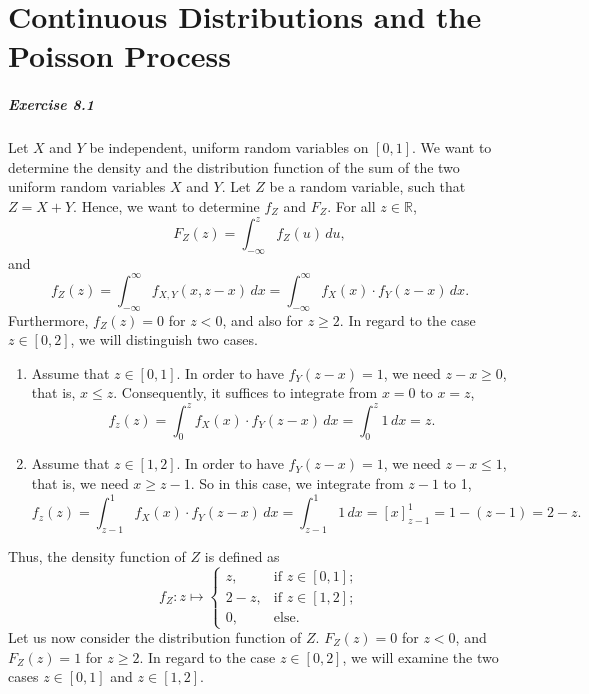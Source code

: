 \chapter{Continuous Distributions and the Poisson Process}

\paragraph{Exercise 8.1} Let $X$ and $Y$ be independent, uniform random variables
on $[0,1]$. We want to determine the density and the distribution function of the
sum of the two uniform random variables $X$ and $Y$. Let $Z$ be a random variable,
such that $Z = X + Y$. Hence, we want to determine $f_Z$ and $F_Z$. For all
$z \in \mathbb{R}$,
\[
    F_Z(z) = \int_{- \infty}^{z} f_Z(u) \, du,
\]
and
\[
    f_Z(z)
        = \int_{- \infty}^{\infty} f_{X,Y}(x,z-x) \, dx
        = \int_{- \infty}^{\infty} f_X(x)\cdot f_Y(z-x) \, dx.
\]
Furthermore, $f_Z(z) = 0$ for $z < 0$, and also for $z \geq 2$. In regard to the
case $z \in [0,2]$, we will distinguish two cases.
\begin{enumerate}
    \item[(i)] Assume that $z \in [0,1]$. In order to have $f_Y(z-x) = 1$, we need
    $z-x \geq 0$, that is, $x \leq z$. Consequently, it suffices to integrate from
    $x=0$ to $x = z$,
    \[
        f_z(z)
            = \int_{0}^{z} f_X(x)\cdot f_Y(z-x) \, dx
            = \int_{0}^{z} 1 \, dx
            = z.
    \]

    \item[(ii)] Assume that $z \in [1,2]$. In order to have $f_Y(z-x) = 1$, we
    need $z-x \leq 1$, that is, we need $x \geq z-1$. So in this case, we integrate
    from $z-1$ to 1,
    \[
    f_z(z)
        = \int_{z-1}^{1} f_X(x)\cdot f_Y(z-x) \, dx
        = \int_{z-1}^{1} 1 \, dx
        = \left[ x \right]_{z-1}^1
        = 1 - (z-1)
        = 2 - z.
    \]
\end{enumerate}
Thus, the density function of $Z$ is defined as
\[
    f_Z: z \mapsto
    \begin{cases}
        z, &\text{if }z  \in [0,1]; \\
        2-z, &\text{if }z \in [1,2]; \\
        0,  &\text{else.}
    \end{cases}
\]
Let us now consider the distribution function of $Z$. $F_Z(z) = 0$ for $z < 0$,
and $F_Z(z) = 1$ for $z \geq 2$. In regard to the case $z \in [0,2]$, we will
examine the two cases $z \in [0,1]$ and $z \in [1,2]$.
